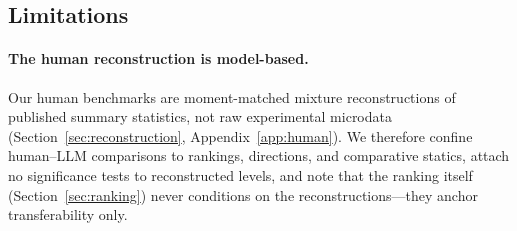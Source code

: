 \begin{table}[t]
\centering
\small
{}
\caption{Approximate cost of instruments for testing simplicity-preserving design levers. $^{\dagger}$\citet{li2017obviously}'s main experiment paid 144 subjects an average of \$37.54 (including a \$20 show-up fee), $\approx\$5{,}400$ total; documented for the main experiment only. The paper's one-shot follow-up added 404 subjects (\$5 show-up plus incentive payments), for 548 subjects overall, but does not report an average payment for the follow-up, so a total cost across both experiments is not recoverable from the published figures. $^{\ddagger}$\citet{gonczarowski2024describing} paid Prolific participants an average of £15.0 ($\approx\$19$) and Cornell participants an average of \$25.5 across $542$ subjects (Appendix A.1 of that paper).}
\label{tab:cost}
\end{table}

\subsection{Limitations}\label{sec:discussion-limitations}

\paragraph{The human reconstruction is model-based.} Our human benchmarks are moment-matched mixture reconstructions of published summary statistics, not raw experimental microdata (Section~\ref{sec:reconstruction}, Appendix~\ref{app:human}). We therefore confine human--LLM comparisons to rankings, directions, and comparative statics, attach no significance tests to reconstructed levels, and note that the ranking itself (Section~\ref{sec:ranking}) never conditions on the reconstructions---they anchor transferability only. 

